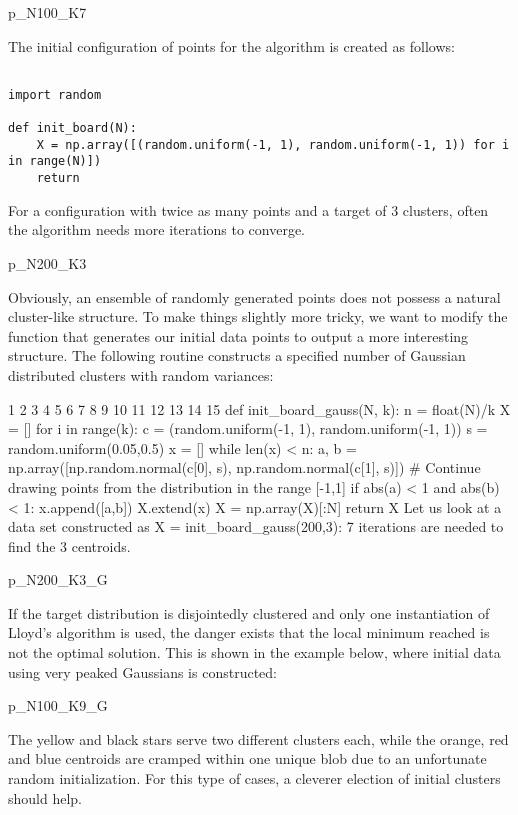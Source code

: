 p_N100_K7

The initial configuration of points for the algorithm is created as follows:

\begin{framed}
\begin{verbatim}

import random
 
def init_board(N):
    X = np.array([(random.uniform(-1, 1), random.uniform(-1, 1)) for i in range(N)])
    return 

\end{verbatim}
\end{framed}

For a configuration with twice as many points and a target of 3 clusters, often the algorithm needs more iterations to converge.

p_N200_K3

Obviously, an ensemble of randomly generated points does not possess a natural cluster-like structure. To make things slightly more tricky, we want to modify the function that generates our initial data points to output a more interesting structure. The following routine constructs a specified number of Gaussian distributed clusters with random variances:

1
2
3
4
5
6
7
8
9
10
11
12
13
14
15
def init_board_gauss(N, k):
    n = float(N)/k
    X = []
    for i in range(k):
        c = (random.uniform(-1, 1), random.uniform(-1, 1))
        s = random.uniform(0.05,0.5)
        x = []
        while len(x) < n:
            a, b = np.array([np.random.normal(c[0], s), np.random.normal(c[1], s)])
            # Continue drawing points from the distribution in the range [-1,1]
            if abs(a) < 1 and abs(b) < 1:
                x.append([a,b])
        X.extend(x)
    X = np.array(X)[:N]
    return X
Let us look at a data set constructed as X = init_board_gauss(200,3): 7 iterations are needed to find the 3 centroids.

p_N200_K3_G

If the target distribution is disjointedly clustered and only one instantiation of Lloyd’s algorithm is used, the danger exists that the local minimum reached is not the optimal solution. This is shown in the example below, where initial data using very peaked Gaussians is constructed:

p_N100_K9_G

The yellow and black stars serve two different clusters each, while the orange, red and blue centroids are cramped within one unique blob due to an unfortunate random initialization. For this type of cases, a cleverer election of initial clusters should help.

